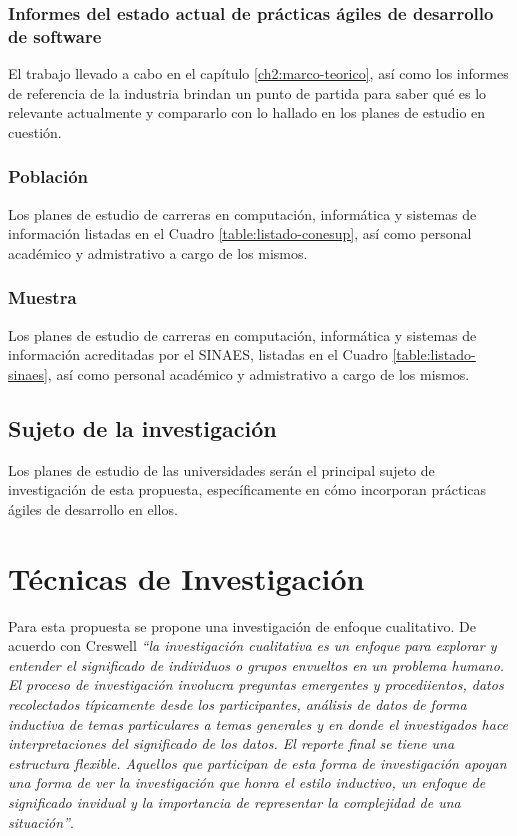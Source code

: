\subsubsection{Informes del estado actual de prácticas ágiles de desarrollo de software}
El trabajo llevado a cabo en el capítulo \ref{ch2:marco-teorico}, así como los informes de referencia de la industria \cite{version-one, puppet-devops} brindan un punto de partida para saber qué es lo relevante actualmente y compararlo con lo hallado en los planes de estudio en cuestión.


\subsubsection{Población}
Los planes de estudio de carreras en computación, informática y sistemas de información listadas en el Cuadro \ref{table:listado-conesup}, así como personal académico y admistrativo a cargo de los mismos.

\subsubsection{Muestra}
Los planes de estudio de carreras en computación, informática y sistemas de información acreditadas por el SINAES, listadas en el Cuadro \ref{table:listado-sinaes}, así como personal académico y admistrativo a cargo de los mismos.

\subsection{Sujeto de la investigación}
Los planes de estudio de las universidades serán el principal sujeto de investigación de esta propuesta, específicamente en cómo incorporan prácticas ágiles de desarrollo en ellos.


\section{Técnicas de Investigación}
Para esta propuesta se propone una investigación de enfoque cualitativo. De acuerdo con  Creswell \cite{creswell} \emph{``la investigación cualitativa es un enfoque para explorar y entender el significado de individuos o grupos envueltos en un problema humano. El proceso de investigación involucra preguntas emergentes y procediientos, datos recolectados típicamente desde los participantes, análisis de datos de forma inductiva de temas particulares a temas generales y en donde el investigados hace interpretaciones del significado de los datos. El reporte final se tiene una estructura flexible. Aquellos que participan de esta forma de investigación apoyan una forma de ver la investigación que honra el estilo inductivo, un enfoque de significado invidual y la importancia de representar la complejidad de una situación''}.

